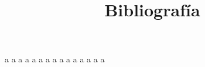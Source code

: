 \documentclass[a4paper,10pt]{article}
\title{Bibliograf\'ia}
\date{\displaydate{date}}
\begin{document}
\maketitle

{\color{white} a\cite{xie_international_2011} }
{\color{white} a\cite{libro_elias} }
{\color{white} a\cite{Libro_castro}}
{\color{white} a\cite{5270436}}
{\color{white} a\cite{4269922}}
{\color{white} a\cite{782539}}
{\color{white} a\cite{980807}}
{\color{white} a\cite{5270436}}
{\color{white} a\cite{1303155}}
{\color{white} a\cite{260665}}
{\color{white} a\cite{4631116}}
{\color{white} a\cite{4756760}}
{\color{white} a\cite{4594448}}
{\color{white} a\cite{4344780}}
{\color{white} a\cite{6398106}}

\medskip




\end{document}
